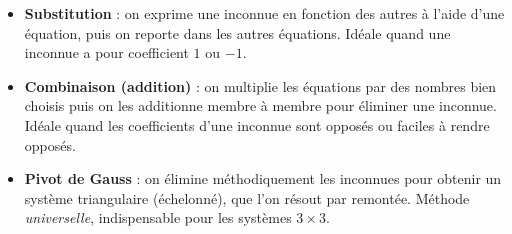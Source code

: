 \documentclass[11pt]{article}
\begin{document}
\begin{aretenir}
\begin{itemize}
\item \textbf{Substitution} : on exprime une inconnue en fonction des autres à l'aide d'une équation, puis on reporte dans les autres équations. Idéale quand une inconnue a pour coefficient $1$ ou $-1$.
\item \textbf{Combinaison (addition)} : on multiplie les équations par des nombres bien choisis puis on les additionne membre à membre pour éliminer une inconnue. Idéale quand les coefficients d'une inconnue sont opposés ou faciles à rendre opposés.
\item \textbf{Pivot de Gauss} : on élimine méthodiquement les inconnues pour obtenir un système triangulaire (échelonné), que l'on résout par remontée. Méthode \emph{universelle}, indispensable pour les systèmes $3\times 3$.
\end{itemize}
\end{aretenir}
\end{document}
